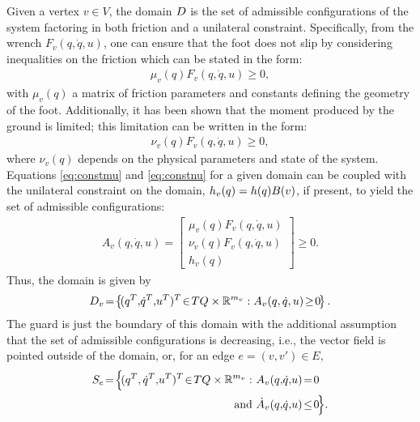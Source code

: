 Given a vertex $v \in V$, the domain $D$ is the set of admissible configurations of the system factoring in both friction and a unilateral constraint. Specifically, from the wrench $F_{v}(q, {\dot q}, u)$, one can ensure that the foot does not slip by considering inequalities on the friction which can be stated in the form:
\begin{align}
  \label{eq:constmu}
  \mu_{v}(q) F_{v}(q, {\dot q}, u) \geq 0,
\end{align}
with $\mu_{v}(q)$ a matrix of friction parameters and constants defining the geometry of the foot.\cite{GCAS10}\xspace Additionally, it has been shown\cite{CBAA09,VBSS90} that the moment produced by the ground is limited; this limitation can be written in the form:
\begin{align}
  \label{eq:constnu}
  \nu_{v}(q) F_{v}(q, {\dot q}, u) \geq 0,
\end{align}
where $\nu_{v}(q)$ depends on the physical parameters and state of the system. Equations \eqref{eq:constmu} and \eqref{eq:constnu} for a given domain can be coupled with the unilateral constraint on the domain, $h_{v}(q) = h(q) B(v)$, if present, to yield the set of admissible configurations:
\begin{align}
  \label{admissible}
  A_{v}(q, {\dot q}, u) = \left[ \begin{array}{c}
      \mu_{v}(q) F_{v}(q, {\dot q}, u)\\
      \nu_{v}(q) F_{v}(q, {\dot q}, u)\\
      h_{v}(q)
    \end{array} \right] \geq 0.
\end{align}
Thus, the domain is given by
\begin{align}
  \label{eq:domain}
  \D_{v} \! = \! \left\{ \! (q^{T}, \! {\dot q}^{T}, \! u^{T})^{T} \! \in \! TQ \times \R^{m_{v}} : A_{v}(q, {\dot q}, u) \! \geq \! 0 \! \right\}.
\end{align}
The guard is just the boundary of this domain with the additional assumption that the set of admissible configurations is decreasing, i.e., the vector field is pointed outside of the domain, or, for an edge $e = (v, v') \in E$,
\begin{align}
  S_{e} \! = \! \Bigl\{ \!(q^{T}, {\dot q}^{T}, \! u^{T})^{T} \! \in \! TQ \times \R^{m_v} : \ &A_{v}(q, \! {\dot q}, \! u) \! = \! 0 \\
\nonumber
  \mathrm{and} \ &{\dot A}_{v}(q, \! {\dot q}, \! u) \! \leq \! 0 \! \Bigl\}.
\end{align}

